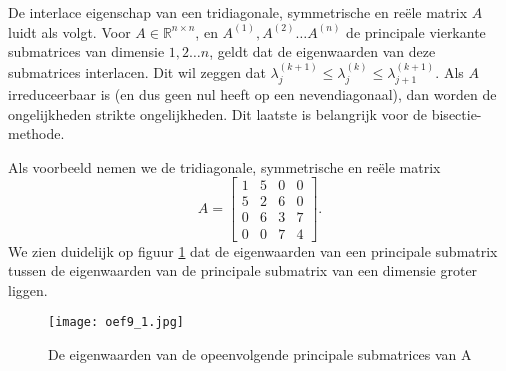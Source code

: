 De interlace eigenschap van een tridiagonale, symmetrische en re\"ele matrix $A$ luidt als volgt. Voor $A \in \mathbb{R}^{n \times n}$, en $A^{(1)}, A^{(2)}  \dots A^{(n)}$ de principale vierkante submatrices van dimensie $1, 2 \dots n$, geldt dat de eigenwaarden van deze submatrices interlacen. Dit wil zeggen dat $\lambda_j^{(k+1)} \leq \lambda_j^{(k)} \leq \lambda_{j+1}^{(k+1)}$. Als $A$ irreduceerbaar is (en dus geen nul heeft op een nevendiagonaal), dan worden de ongelijkheden strikte ongelijkheden. Dit laatste is belangrijk voor de bisectie-methode.

Als voorbeeld nemen we de tridiagonale, symmetrische en re\"ele matrix
$$A = \begin{bmatrix} 
1 &5 &0 &0\\
5 &2 &6 &0 \\
0 &6 &3 &7\\
0 &0 &7 &4
\end{bmatrix}.$$
We zien duidelijk op figuur \ref{fig:oef9_1} dat de eigenwaarden van een principale submatrix tussen de eigenwaarden van de principale submatrix van een dimensie groter liggen.

\begin{figure}[H]
    \centering
    \texttt{[image: oef9\_1.jpg]}
    \caption{De eigenwaarden van de opeenvolgende principale submatrices van A}
    \label{fig:oef9_1}
\end{figure}